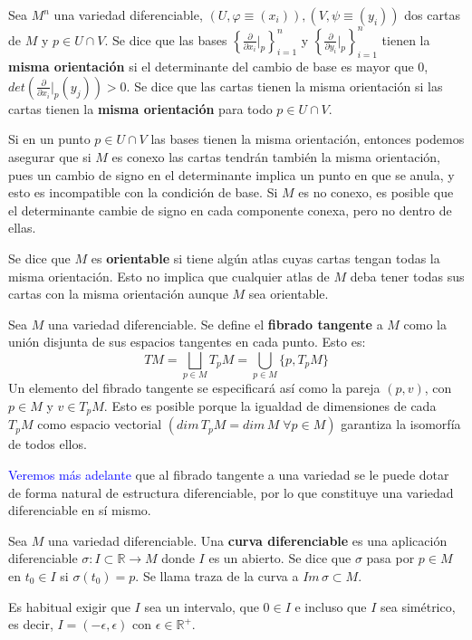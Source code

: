 \begin{defi}
Sea $M^n$ una variedad diferenciable, $(U,\varphi\equiv (x_i)), (V,\psi \equiv (y_i))$ dos cartas de $M$ y $p \in U \cap V$. Se dice que las bases $\left\{{\frac{\partial}{\partial x_i}}{\big|_p}\right\}_{i=1}^n$ y $\left\{{\frac{\partial}{\partial y_i}}{\big|_p}\right\}_{i=1}^n$ tienen la \textbf{misma orientación} si el determinante del cambio de base es mayor que $0$, $det\left({\frac{\partial}{\partial x_i}}{\big|_p}(y_j)\right) > 0$. Se dice que las cartas tienen la misma orientación si las cartas tienen la \textbf{misma orientación} para todo $p \in U\cap V$. 
\end{defi}
\begin{obs}
Si en un punto $p \in U\cap V$ las bases tienen la misma orientación, entonces podemos asegurar que si $M$ es conexo las cartas tendrán también la misma orientación, pues un cambio de signo en el determinante implica un punto en que se anula, y esto es incompatible con la condición de base. Si $M$ es no conexo, es posible que el determinante cambie de signo en cada componente conexa, pero no dentro de ellas.
\end{obs}

\begin{defi}
Se dice que $M$ es \textbf{orientable} si tiene algún atlas cuyas cartas tengan todas la misma orientación. Esto no implica que cualquier atlas de $M$ deba tener todas sus cartas con la misma orientación aunque $M$ sea orientable.
\end{defi}

\begin{defi}
Sea $M$ una variedad diferenciable. Se define el \textbf{fibrado tangente} a $M$ como la unión disjunta de sus espacios tangentes en cada punto. Esto es:
$$TM = \underset{p \in M}{\bigsqcup} T_pM = \underset{p \in M}{\bigcup} \{p,T_p M\}$$
Un elemento del fibrado tangente se especificará así como la pareja $(p,v)$, con $p \in M$ y $v \in T_pM$. Esto es posible porque la igualdad de dimensiones de cada $T_pM$ como espacio vectorial $(dim\,T_pM = dim\,M \;\forall p \in M)$ garantiza la isomorfía de todos ellos.

\textcolor{blue}{Veremos más adelante} que al fibrado tangente a una variedad se le puede dotar de forma natural de estructura diferenciable, por lo que constituye una variedad diferenciable en sí mismo.
\end{defi}

\begin{defi}
Sea $M$ una variedad diferenciable. Una \textbf{curva diferenciable} es una aplicación diferenciable $\sigma: I\subset \mathbb{R} \longrightarrow M$ donde $I$ es un abierto. Se dice que $\sigma$ pasa por $p \in M$ en $t_0 \in I$ si $\sigma(t_0)=p$. Se llama traza de la curva a $Im\,\sigma \subset M$.
\end{defi}
\begin{obs}
Es habitual exigir que $I$ sea un intervalo, que $0\in I$ e incluso que $I$ sea simétrico, es decir, $I = (-\epsilon, \epsilon)$ con $\epsilon \in \mathbb{R}^+$.
\end{obs}

